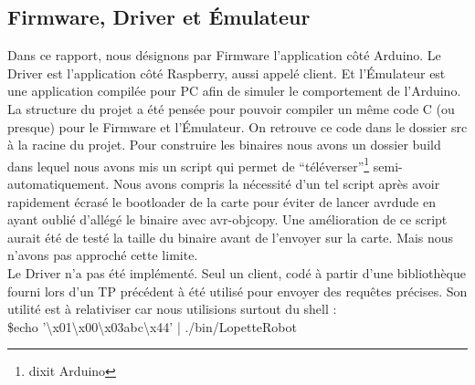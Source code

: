 \subsection{Firmware, Driver et Émulateur}
Dans ce rapport, nous désignons par Firmware l'application côté Arduino. 
Le Driver est l'application côté Raspberry, aussi appelé client. Et l'Émulateur
est une application compilée pour PC afin de simuler le comportement de
l'Arduino.\\

La structure du projet a été pensée pour pouvoir compiler un même code C
(ou presque) pour le Firmware et l'Émulateur. On retrouve ce code dans le
dossier src à la racine du projet. Pour construire les binaires nous avons 
un dossier build dans lequel nous avons mis un script qui permet de 
``téléverser''\footnote{dixit Arduino} semi-automatiquement. Nous avons
compris la nécessité d'un tel script après avoir rapidement écrasé le bootloader
de la carte pour éviter de lancer avrdude en ayant oublié d'allégé le binaire
avec avr-objcopy. Une amélioration de ce script aurait été de testé la taille 
du binaire avant de l'envoyer sur la carte. Mais nous n'avons pas approché
cette limite.\\

Le Driver n'a pas été implémenté. Seul un client, codé à partir d'une bibliothèque
fourni lors d'un TP précédent à été utilisé pour envoyer des requêtes précises.
Son utilité est à relativiser car nous utilisions surtout du shell :\\
\$echo '\backslash x01\backslash x00\backslash x03abc\backslash x44' | ./bin/LopetteRobot\\

